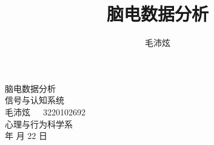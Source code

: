 \documentclass[jou,12pt,floatsintext]{apa7} %
\title{\heiti 脑电数据分析} %
\author{\fangsong 毛沛炫}
\affiliation{(浙江大学心理与行为科学系\ \ 310058)}
\begin{document}
\begin{titlepage}
    \centering
    \vspace*{4cm} %
    \Huge
    {\heiti 脑电数据分析} \\
    \vspace{0.75cm}
    \large
    信号与认知系统 \\
    \vspace{2.25cm}
    \large
    毛沛炫\ \ \ 3220102692 \\
    \vspace{0.5cm}
    \large
    心理与行为科学系 \\
    \vspace{0.5cm}
    \large
    \number\year 年 \number\month 月 22 日 \\
    \vfill
\end{titlepage}

\maketitle %



\end{document}
